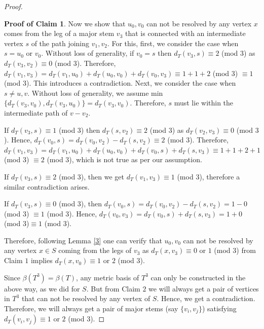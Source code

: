 \documentclass{article}
\theoremstyle{definition}
\numberwithin{equation}{section}
\newtheorem{claimproof}{Proof of Claim}
\begin{document}
\begin{proof}
\begin{claimproof}
\vspace{0.3em}
\noindent Now we show that $u_{0},v_{0}$ can not be resolved by any vertex $x$ comes from the leg of a major stem $v_{3}$ that is connected with an intermediate vertex $s$ of the path joining $v_{1}, v_{2}$. For this, first, we consider the case when $s=u_{0}$ or $v_{0}$. Without loss of generality, if $v_{0}=s$ then $d_{T}(v_{3},s)\equiv 2$ (mod $3$) as $d_{T}(v_{3},v_{2})\equiv 0$ (mod $3$). Therefore, $d_{T}(v_{1},v_{3})=d_{T}(v_{1},u_{0})+d_{T}(u_{0},v_{0})+d_{T}(v_{0},v_{3})\equiv 1+1+2$ (mod $3$) $\equiv 1$ (mod $3$). This introduces a contradiction. 
Next, we consider the case when $s\neq u,v$. Without loss of generality, we assume min $\{d_{T}(v_{3},v_{0}),d_{T}(v_{3},u_{0})\}=d_{T}(v_{3},v_{0})$. Therefore, $s$ must lie within the intermediate path of $v-v_{2}$. 

\vspace{0.4em}
\noindent If $d_{T}(v_{3},s)\equiv 1$ (mod $3$) then $d_{T}(s,v_{2})\equiv 2$ (mod $3$) as $d_{T}(v_{2},v_{3})\equiv 0$ (mod $3$). Hence, $d_{T}(v_{0},s)=d_{T}(v_{0},v_{2})-d_{T}(s,v_{2})\equiv 2$ (mod $3$). Therefore, $d_{T}(v_{1},v_{3})=d_{T}(v_{1},u_{0})+d_{T}(u_{0},v_{0})+d_{T}(v_{0},s)+d_{T}(s,v_{3})\equiv 1+1+2+1$ 
(mod $3$) $\equiv 2$ (mod $3$), which is not true as per our assumption. 

\vspace{0.3em}
\noindent  If $d_{T}(v_{3},s)\equiv 2$ (mod $3$), then we get $d_{T}(v_{1},v_{3})\equiv 1$ (mod $3$), therefore a similar contradiction arises.

\vspace{0.3em}
\noindent If $d_{T}(v_{3},s)\equiv 0$ (mod $3$), then $d_{T}(v_{0},s)=d_{T}(v_{0},v_{2})-d_{T}(s,v_{2})=1-0$ (mod $3$) $\equiv 1$ (mod $3$). Hence, $d_{T}(v_{0},v_{3})=d_{T}(v_{0},s)+d_{T}(s,v_{3})=1+0$ (mod $3$)$\equiv 1$ (mod $3$).

\vspace{0.3em}
Therefore, following Lemma \ref{3} one can verify that $u_{0},v_{0}$ can not be resolved by any vertex $x\in S$ coming from the legs of $v_{3}$ as $d_{T}(x,v_{3})\equiv 0$ or $1$ (mod $3$) from Claim $1$ implies $d_{T}(x,v_{0})\equiv 1$ or $2$ (mod $3$).
\end{claimproof}


\noindent Since $\beta{(T^{3})}=\beta{(T)}$, any metric basis of $T^{3}$ can only be constructed in the above way, as we did for $S$. But from Claim $2$ we will always get a pair of vertices in $T^{3}$ that can not be resolved by any vertex of $S$. Hence, we get a contradiction. Therefore, we will always get a pair of major stems (say $\{v_{i},v_{j}\}$) satisfying $d_{T}(v_{i},v_{j})\equiv 1$ or $2$ (mod $3$).
\end{proof}
\end{document}
